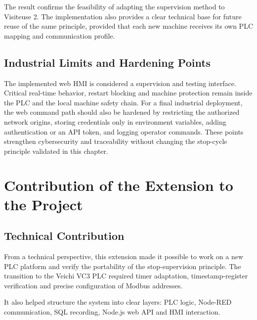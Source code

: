 The result confirms the feasibility of adapting the supervision method to Visiteuse 2. The implementation also provides a clear technical base for future reuse of the same principle, provided that each new machine receives its own PLC mapping and communication profile.

\subsection{Industrial Limits and Hardening Points}
The implemented web HMI is considered a supervision and testing interface. Critical real-time behavior, restart blocking and machine protection remain inside the PLC and the local machine safety chain. For a final industrial deployment, the web command path should also be hardened by restricting the authorized network origins, storing credentials only in environment variables, adding authentication or an API token, and logging operator commands. These points strengthen cybersecurity and traceability without changing the stop-cycle principle validated in this chapter.

\section{Contribution of the Extension to the Project}

\subsection{Technical Contribution}
From a technical perspective, this extension made it possible to work on a new PLC platform and verify the portability of the stop-supervision principle. The transition to the Veichi VC3 PLC required timer adaptation, timestamp-register verification and precise configuration of Modbus addresses.

It also helped structure the system into clear layers: PLC logic, Node-RED communication, SQL recording, Node.js web API and HMI interaction.

